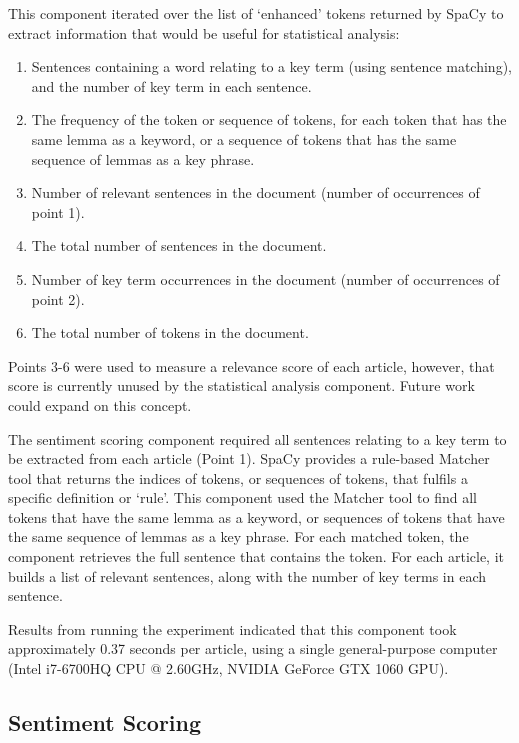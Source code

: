 \documentclass{report}
\begin{document}
This component iterated over the list of `enhanced' tokens returned by SpaCy to extract information that would be useful for statistical analysis:
\begin{enumerate}
	\item Sentences containing a word relating to a key term (using sentence matching), and the number of key term in each sentence.
	\item The frequency of the token or sequence of tokens, for each token that has the same lemma as a keyword, or a sequence of tokens that has the same sequence of lemmas as a key phrase.
	\item Number of relevant sentences in the document (number of occurrences of point 1).
	\item The total number of sentences in the document.
	\item Number of key term occurrences in the document (number of occurrences of point 2).
	\item The total number of tokens in the document.
\end{enumerate}

Points 3-6 were used to measure a relevance score of each article, however, that score is currently unused by the statistical analysis component. 
Future work could expand on this concept.

The sentiment scoring component required all sentences relating to a key term to be extracted from each article (Point 1).
SpaCy provides a rule-based Matcher tool that returns the indices of tokens, or sequences of tokens, that fulfils a specific definition or `rule'.
This component used the Matcher tool to find all tokens that have the same lemma as a keyword, or sequences of tokens that have the same sequence of lemmas as a key phrase.
For each matched token, the component retrieves the full sentence that contains the token. 
For each article, it builds a list of relevant sentences, along with the number of key terms in each sentence.

Results from running the experiment indicated that this component took approximately 0.37 seconds per article, using a single general-purpose computer (Intel i7-6700HQ CPU @ 2.60GHz, NVIDIA GeForce GTX 1060 GPU).

\subsection{Sentiment Scoring} \label{des-sentiment}
\end{document}
